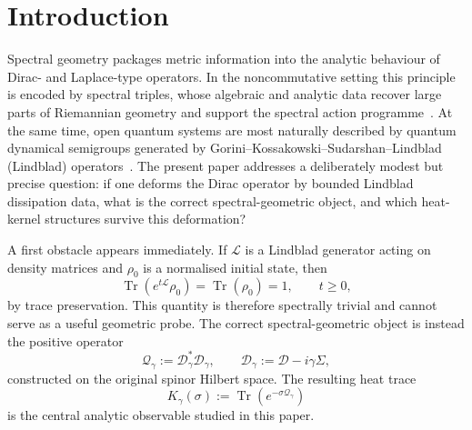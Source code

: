 \documentclass[11pt,a4paper]{article}
\numberwithin{equation}{section}
\theoremstyle{definition}
\newcommand{\cD}{\mathcal{D}}
\newcommand{\cL}{\mathcal{L}}
\newcommand{\Qg}{\mathcal{Q}_\gamma}
\newcommand{\Dg}{\mathcal{D}_\gamma}
\newcommand{\Sig}{\Sigma}
\newcommand{\Tr}{\operatorname{Tr}}
\begin{document}
\section{Introduction}
\label{sec:intro}

Spectral geometry packages metric information into the analytic behaviour
of Dirac- and Laplace-type operators. In the noncommutative setting this
principle is encoded by spectral triples, whose algebraic and analytic
data recover large parts of Riemannian geometry and support the spectral
action programme~\cite{Connes1994,Connes1995,ConnesMarcolli2008,
ChamseddineConnes1997}. At the same time, open quantum systems are most
naturally described by quantum dynamical semigroups generated by
Gorini--Kossakowski--Sudarshan--Lindblad (Lindblad)
operators~\cite{Lindblad1976,GoriniKossakowskiSudarshan1976}. The present
paper addresses a deliberately modest but precise question: if one
deforms the Dirac operator by bounded Lindblad dissipation data, what is
the correct spectral-geometric object, and which heat-kernel structures
survive this deformation?

A first obstacle appears immediately. If $\cL$ is a Lindblad generator
acting on density matrices and $\rho_0$ is a normalised initial state,
then
\begin{equation}
\Tr(e^{t \cL}\rho_0)=\Tr(\rho_0)=1, \qquad t\ge 0,
\end{equation}
by trace preservation. This quantity is therefore spectrally trivial and
cannot serve as a useful geometric probe. The correct spectral-geometric
object is instead the positive operator
\begin{equation}
\Qg:=\Dg^*\Dg,
\qquad
\Dg:=\cD-i\gamma\Sig,
\end{equation}
constructed on the original spinor Hilbert space. The resulting heat trace
\begin{equation}
K_\gamma(\sigma):=\Tr\!\left(e^{-\sigma \Qg}\right)
\end{equation}
is the central analytic observable studied in this paper.
\end{document}
